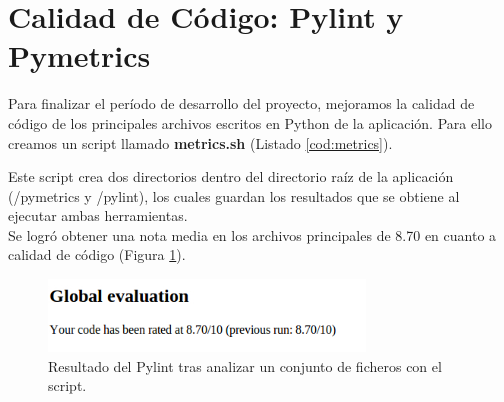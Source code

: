 \section{Calidad de Código: Pylint y Pymetrics}
\label{4:sec12}
Para finalizar el período de desarrollo del proyecto, mejoramos la calidad de código de los principales archivos escritos en Python de la aplicación. 
Para ello creamos un script llamado \textbf{metrics.sh} (Listado \ref{cod:metrics}).\\



\bigskip

Este script crea dos directorios dentro  del directorio raíz de la aplicación (/pymetrics y /pylint), los cuales guardan los resultados que se obtiene al ejecutar ambas herramientas.\\

Se logró obtener una nota media  en los archivos principales de 8.70 en cuanto a calidad de código (Figura \ref{fig:resultado}).\\


\begin{figure}[H]
\begin{center}
\includegraphics[width=0.75\textwidth]{images/pylint.jpg}
\caption{Resultado del Pylint tras analizar un conjunto de ficheros con el script.}
\label{fig:resultado}
\end{center}
\end{figure}








